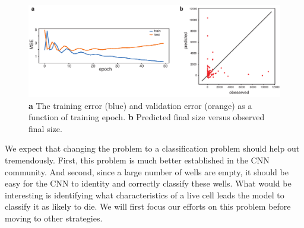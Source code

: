 \documentclass[10pt,twocolumn,letterpaper]{article}
\begin{document}
\begin{figure}[t!]
\begin{center}
 \includegraphics[width=0.8\linewidth]{figures/error_vs_epoch_and_validation_predictions_vs_observed_v2.pdf}
\end{center}
   \caption{\textbf{a} The training error (blue) and validation error (orange) as a function of training epoch.  \textbf{b} Predicted final size versus observed final size.}
\label{results}
\end{figure}


We expect that changing the problem to a classification problem should help out tremendously.  First, this problem is much better established in the CNN community.  And second, since a large number of wells are empty, it should be easy for the CNN to identity and correctly classify these wells.    What would be interesting is identifying what characteristics of a live cell leads the model to classify it as likely to die.  We will first focus our efforts on this problem before moving to other strategies.  


{\small


}
\end{document}
